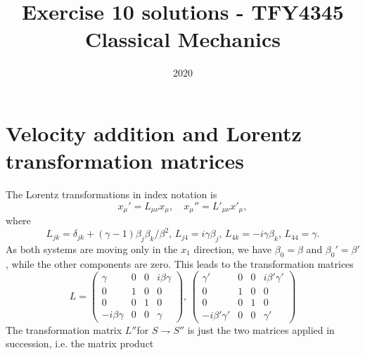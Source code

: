 \documentclass{article}
\title{Exercise 10 solutions - TFY4345 Classical Mechanics}
\date{2020}
\begin{document}
    \maketitle
    \section{Velocity addition and Lorentz transformation matrices}
        The Lorentz transformations in index notation is
        \begin{equation*}
            x_\mu' = L_{\mu\nu}x_\mu, \quad x_\mu'' = L'_{\mu\nu}x'_\mu,
        \end{equation*}
        where
        \begin{equation*}
            L_{jk} = \delta_{jk} + (\gamma - 1) \beta_j\beta_k/\beta^2, \, L_{j4}=i\gamma \beta_j, \, L_{4k} = - i \gamma \beta_k, \, L_{44} = \gamma.
        \end{equation*}
        As both systems are moving only in the $x_1$ direction, we have $\beta_0 = \beta$ and $\beta_0' = \beta'$, while the other components are zero. This leads to the transformation matrices
        \begin{equation*}
            L = 
            \begin{pmatrix*}
                \gamma & 0 & 0 & i \beta \gamma \\
                0 & 1 &  0 & 0 \\
                0 & 0 & 1 & 0 \\
                -i\beta \gamma & 0 & 0 & \gamma
            \end{pmatrix*}
            , \,
            \begin{pmatrix*}
                \gamma' & 0 & 0 & i \beta' \gamma' \\
                0 & 1 &  0 & 0 \\
                0 & 0 & 1 & 0 \\
                -i\beta' \gamma' & 0 & 0 & \gamma'
            \end{pmatrix*}
        \end{equation*} 
        The transformation matrix $L''$for $S \rightharpoondown S''$ is just the two matrices applied in succession, i.e. the matrix product
\end{document}
